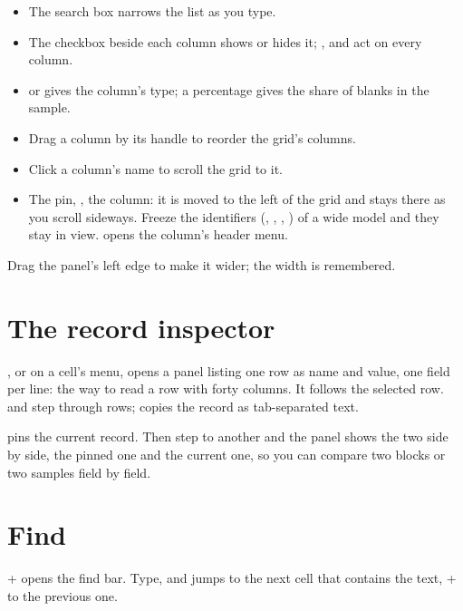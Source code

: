
\begin{itemize}
\item The search box narrows the list as you type.
\item The checkbox beside each column shows or hides it; ,  and 
act on every column.
\item \ui{\#} or  gives the column's type; a percentage gives the share of blanks in the sample.
\item Drag a column by its  handle to reorder the grid's columns.
\item Click a column's name to scroll the grid to it.
\item The pin, \ui{\faThumbtack},  the column: it is moved to the left of the grid and stays there as you
scroll sideways. Freeze the identifiers (, , , ) of a wide model and they stay
in view.  opens the column's header menu.
\end{itemize}

Drag the panel's left edge to make it wider; the width is remembered.

\section{The record inspector}\label{sec:inspector}

, or  on a cell's menu, opens a panel listing one row
as name and value, one field per line: the way to read a row with forty columns. It follows the selected
row.  and  step through rows;  copies the record as tab-separated text.

 pins the current record. Then step to another and the panel shows the two side by side, the pinned
one and the current one, so you can compare two blocks or two samples field by field.

\section{Find}\label{sec:find}

+ opens the find bar. Type, and  jumps to the next cell that contains the
text, + to the previous one.

